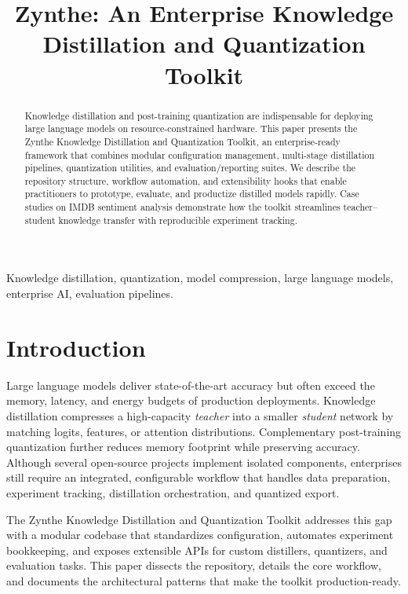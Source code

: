 \documentclass[conference]{IEEEtran}
\title{Zynthe: An Enterprise Knowledge Distillation and Quantization Toolkit}
\author{\IEEEauthorblockN{Lakshin Subramanian\IEEEauthorrefmark{1}, GitHub Copilot\IEEEauthorrefmark{2}}
\IEEEauthorblockA{\IEEEauthorrefmark{1}Zynthe Research Labs, Bengaluru, India\\
Email: lakshin@zynthi.ai\\
\IEEEauthorrefmark{2}AI Programming Assistant, GitHub}}
\begin{document}
\maketitle

\begin{abstract}
Knowledge distillation and post-training quantization are indispensable for deploying large language models on resource-constrained hardware. This paper presents the Zynthe Knowledge Distillation and Quantization Toolkit, an enterprise-ready framework that combines modular configuration management, multi-stage distillation pipelines, quantization utilities, and evaluation/reporting suites. We describe the repository structure, workflow automation, and extensibility hooks that enable practitioners to prototype, evaluate, and productize distilled models rapidly. Case studies on IMDB sentiment analysis demonstrate how the toolkit streamlines teacher--student knowledge transfer with reproducible experiment tracking.
\end{abstract}

\begin{IEEEkeywords}
Knowledge distillation, quantization, model compression, large language models, enterprise AI, evaluation pipelines.
\end{IEEEkeywords}

\section{Introduction}
Large language models deliver state-of-the-art accuracy but often exceed the memory, latency, and energy budgets of production deployments. Knowledge distillation \cite{hinton2015distilling, buciluua2006model} compresses a high-capacity \emph{teacher} into a smaller \emph{student} network by matching logits, features, or attention distributions. Complementary post-training quantization \cite{jacob2018quantization, nagel2021whitepaper} further reduces memory footprint while preserving accuracy. Although several open-source projects implement isolated components, enterprises still require an integrated, configurable workflow that handles data preparation, experiment tracking, distillation orchestration, and quantized export.

The Zynthe Knowledge Distillation and Quantization Toolkit addresses this gap with a modular codebase that standardizes configuration, automates experiment bookkeeping, and exposes extensible APIs for custom distillers, quantizers, and evaluation tasks. This paper dissects the repository, details the core workflow, and documents the architectural patterns that make the toolkit production-ready.
\end{document}
